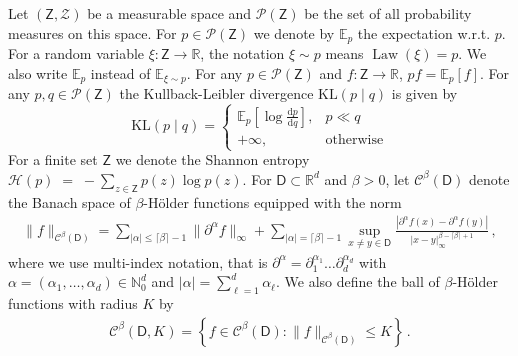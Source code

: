\documentclass{article}
\theoremstyle{definition}
\theoremstyle{remark}
\theoremstyle{plain}
\newcommand{\E}{\mathbb{E}}
\newcommand{\KL}{\mathrm{KL}}
\def\Zset{\mathsf{Z}}
\def\Zsigma{\mathcal{Z}}
\def\eqsp{\,}
\def\rset{\mathbb{R}}
\def\rmd{\mathrm{d}}
\def\Pens{\mathcal{P}}
\numberwithin{equation}{section}
\begin{document}
Let $(\Zset,\Zsigma)$ be a measurable space and $\Pens(\Zset)$ be the set of all probability measures on this space. For $p \in \Pens(\Zset)$ we denote by $\E_p$ the expectation w.r.t. $p$. For a random variable $\xi: \Zset \to \rset$, the notation $\xi \sim p$ means $\operatorname{Law}(\xi) = p$. We also write $\E_{p}$ instead of $\E_{\xi \sim p}$. For any $p \in \Pens(\Zset)$ and $f: \Zset \to \rset$, $p f = \E_p[f]$. For any $p, q \in \Pens(\Zset)$ the Kullback-Leibler divergence $\KL(p \mid q)$ is given by
\[
\KL(p \mid q) = \begin{cases}
\E_{p}[\log \frac{\rmd p}{\rmd q}], & p \ll q \\
+ \infty, & \text{otherwise}
\end{cases} 
\]
For a finite set $\Zset$ we denote the Shannon entropy
\(\mathcal{H}(p) \;=\; -\sum_{z \in \Zset} p(z)\log p(z)\). For \(\mathsf D \subset \rset^d\) and \(\beta>0\), let
\(\mathcal C^\beta(\mathsf D)\) denote the Banach space of
\(\beta\)-H\"older functions equipped with the norm
\begin{align}
\label{eq:holder_norm}
    \|f\|_{\mathcal C^\beta(\mathsf D)} =\sum_{|\alpha| \le \lceil \beta\rceil -1} \|\partial^\alpha f\|_\infty 
+ \sum_{ |\alpha| = \lceil\beta\rceil -1} \sup_{x \neq y \in \mathsf D} \frac{|\partial^\alpha f(x) - \partial^\alpha f(y)|}{|x - y|^{\beta - \lceil\beta\rceil + 1}_{\infty}}\eqsp,
\end{align}
where we use multi-index notation, that is $\partial^\alpha = \partial_1^{\alpha_1} \ldots \partial_d^{\alpha_d}$ with $\alpha = (\alpha_1, \ldots, \alpha_d) \in \mathbb{N}_0^d$ and $|\alpha| = \sum_{\ell=1}^d \alpha_\ell$.
We also define the ball of $\beta$-H\"older functions with radius $K$ by
\begin{align}
\mathcal C^\beta(\mathsf D, K) = \left \{f\in \mathcal C^\beta(\mathsf D): \|f\|_{\mathcal C^\beta(\mathsf D)} \le K
\right\}\eqsp.
\end{align}
\end{document}
